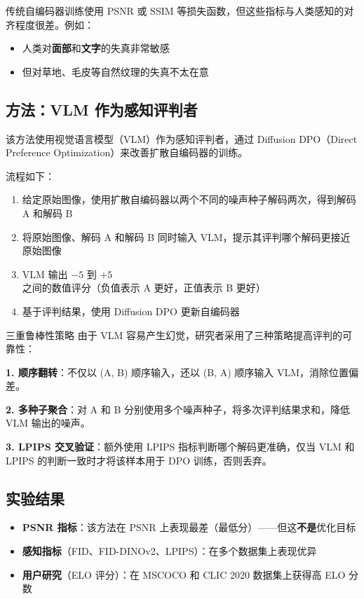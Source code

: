 \documentclass[a4paper]{article}
\begin{document}
传统自编码器训练使用 PSNR 或 SSIM 等损失函数，但这些指标与人类感知的对齐程度很差。例如：

\begin{itemize}
    \item 人类对\textbf{面部}和\textbf{文字}的失真非常敏感
    \item 但对草地、毛皮等自然纹理的失真不太在意
\end{itemize}

\subsection{方法：VLM 作为感知评判者}

该方法使用视觉语言模型（VLM）作为感知评判者，通过 Diffusion DPO（Direct Preference Optimization）来改善扩散自编码器的训练。

流程如下：

\begin{enumerate}
    \item 给定原始图像，使用扩散自编码器以两个不同的噪声种子解码两次，得到解码 A 和解码 B
    \item 将原始图像、解码 A 和解码 B 同时输入 VLM，提示其评判哪个解码更接近原始图像
    \item VLM 输出 $-5$ 到 $+5$ 之间的数值评分（负值表示 A 更好，正值表示 B 更好）
    \item 基于评判结果，使用 Diffusion DPO 更新自编码器
\end{enumerate}

\begin{importantbox}{三重鲁棒性策略}
由于 VLM 容易产生幻觉，研究者采用了三种策略提高评判的可靠性：

\textbf{1. 顺序翻转}：不仅以 (A, B) 顺序输入，还以 (B, A) 顺序输入 VLM，消除位置偏差。

\textbf{2. 多种子聚合}：对 A 和 B 分别使用多个噪声种子，将多次评判结果求和，降低 VLM 输出的噪声。

\textbf{3. LPIPS 交叉验证}：额外使用 LPIPS 指标判断哪个解码更准确，仅当 VLM 和 LPIPS 的判断一致时才将该样本用于 DPO 训练，否则丢弃。
\end{importantbox}

\subsection{实验结果}

\begin{itemize}
    \item \textbf{PSNR 指标}：该方法在 PSNR 上表现最差（最低分）——但这\textbf{不是}优化目标
    \item \textbf{感知指标}（FID、FID-DINOv2、LPIPS）：在多个数据集上表现优异
    \item \textbf{用户研究}（ELO 评分）：在 MSCOCO 和 CLIC 2020 数据集上获得高 ELO 分数
\end{itemize}
\end{document}
